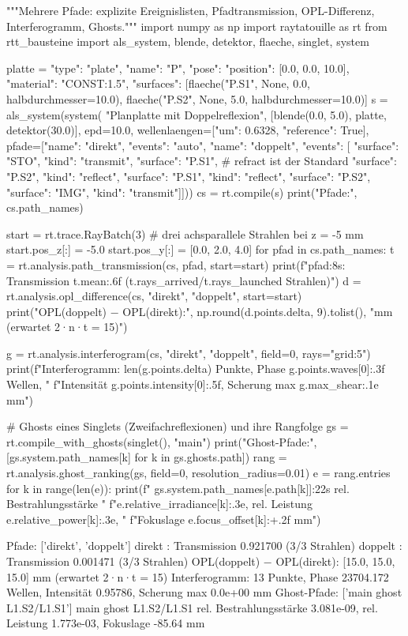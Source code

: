 \documentclass[11pt,a4paper,openany]{book}
\DeclareRobustCommand{\code}[1]{\texttt{\directlua{rttcode("\luaescapestring{\detokenize{#1}}")}}}
\begin{document}
\begin{pycode}[title={\code{ex12_pfade.py}}]
"""Mehrere Pfade: explizite Ereignislisten, Pfadtransmission, OPL-Differenz, Interferogramm, Ghosts."""
import numpy as np
import raytatouille as rt
from rtt_bausteine import als_system, blende, detektor, flaeche, singlet, system

platte = {"type": "plate", "name": "P", "pose": {"position": [0.0, 0.0, 10.0]},
          "material": "CONST:1.5",
          "surfaces": [flaeche("P.S1", None, 0.0, halbdurchmesser=10.0),
                       flaeche("P.S2", None, 5.0, halbdurchmesser=10.0)]}
s = als_system(system(
    "Planplatte mit Doppelreflexion", [blende(0.0, 5.0), platte, detektor(30.0)], epd=10.0,
    wellenlaengen=[{"um": 0.6328, "reference": True}],
    pfade=[{"name": "direkt", "events": "auto"},
           {"name": "doppelt", "events": [
               {"surface": "STO", "kind": "transmit"},
               {"surface": "P.S1"},                       # refract ist der Standard
               {"surface": "P.S2", "kind": "reflect"},
               {"surface": "P.S1", "kind": "reflect"},
               {"surface": "P.S2"},
               {"surface": "IMG", "kind": "transmit"}]}]))
cs = rt.compile(s)
print("Pfade:", cs.path_names)

start = rt.trace.RayBatch(3)                    # drei achsparallele Strahlen bei z = -5 mm
start.pos_z[:] = -5.0
start.pos_y[:] = [0.0, 2.0, 4.0]
for pfad in cs.path_names:
    t = rt.analysis.path_transmission(cs, pfad, start=start)
    print(f"{pfad:8s}: Transmission {t.mean:.6f} ({t.rays_arrived}/{t.rays_launched} Strahlen)")
d = rt.analysis.opl_difference(cs, "direkt", "doppelt", start=start)
print("OPL(doppelt) − OPL(direkt):", np.round(d.points.delta, 9).tolist(), "mm (erwartet 2·n·t = 15)")

g = rt.analysis.interferogram(cs, "direkt", "doppelt", field=0, rays="grid:5")
print(f"Interferogramm: {len(g.points.delta)} Punkte, Phase {g.points.waves[0]:.3f} Wellen, "
      f"Intensität {g.points.intensity[0]:.5f}, Scherung max {g.max_shear:.1e} mm")

# Ghosts eines Singlets (Zweifachreflexionen) und ihre Rangfolge
gs = rt.compile_with_ghosts(singlet(), "main")
print("Ghost-Pfade:", [gs.system.path_names[k] for k in gs.ghosts.path])
rang = rt.analysis.ghost_ranking(gs, field=0, resolution_radius=0.01)
e = rang.entries
for k in range(len(e)):
    print(f"  {gs.system.path_names[e.path[k]]:22s} rel. Bestrahlungsstärke "
          f"{e.relative_irradiance[k]:.3e}, rel. Leistung {e.relative_power[k]:.3e}, "
          f"Fokuslage {e.focus_offset[k]:+.2f} mm")
\end{pycode}
\begin{ausgabe}
Pfade: ['direkt', 'doppelt']
direkt  : Transmission 0.921700 (3/3 Strahlen)
doppelt : Transmission 0.001471 (3/3 Strahlen)
OPL(doppelt) − OPL(direkt): [15.0, 15.0, 15.0] mm (erwartet 2·n·t = 15)
Interferogramm: 13 Punkte, Phase 23704.172 Wellen, Intensität 0.95786, Scherung max 0.0e+00 mm
Ghost-Pfade: ['main ghost L1.S2/L1.S1']
  main ghost L1.S2/L1.S1 rel. Bestrahlungsstärke 3.081e-09, rel. Leistung 1.773e-03, Fokuslage -85.64 mm
\end{ausgabe}
\end{document}

